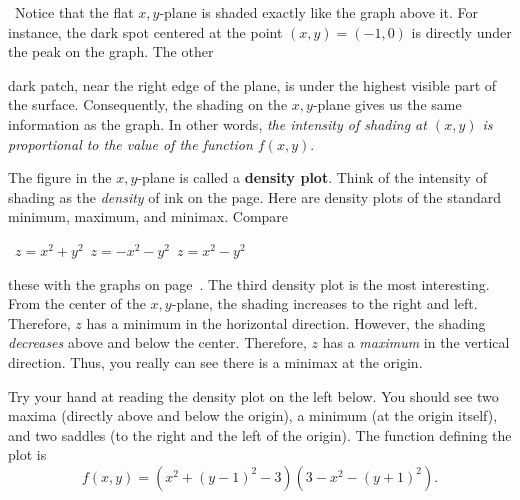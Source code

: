 {{{{\quad \ Notice that the flat $x, y$-plane is shaded exactly like the graph above it.  For instance, the dark spot centered at the point $(x, y) = (-1, 0)$ is directly under the peak on the graph.  The other 
\linebreak
\vspace{-9pt}

\noindent
dark patch, near the right edge of the plane, is under the highest visible part of the surface.  Consequently, the shading on the $x, y$-plane gives us the same information as the graph.  In other words, {\em the intensity of shading at $(x, y)$ is proportional to the value of the function $f(x, y)$}.

	The figure in the $x, y$-plane is called a {\bf density plot}.  
Think of the intensity of shading as the {\em density\/} of ink on the page.  Here are density plots of the standard minimum, maximum, and minimax.  Compare
\label{density}
\linebreak
	
\vspace{140pt}

\noindent
\mbox{
	\small
	\mbox{} \hspace{25pt}
	$z = x^2 + y^2$
	\hspace{70pt}
	$z = -x^2 - y^2$
	\hspace{80pt}
	$z = x^2 - y^2$
}

\vspace{6pt}

\noindent
these with the graphs on page~\pageref{saddle}.  The third density plot is the most interesting.  From the center of the $x, y$-plane, the shading increases to the right and left.  Therefore, $z$ has a minimum in the horizontal direction.  However, the shading {\em decreases\/} above and below the center.  Therefore, $z$ has a {\em maximum\/} in the vertical direction.  Thus, you really can see there is a minimax at the origin.

	Try your hand at reading the density plot on the left below.  
You should see two maxima (directly above and below the origin), a minimum (at the origin itself), and two saddles (to the right and the left of the origin).  The function defining the plot is
	\[
f(x, y) = (x^2 + (y-1)^2 - 3)(3 - x^2 - (y+1)^2).
\]

\vspace{210pt}

}}}}
